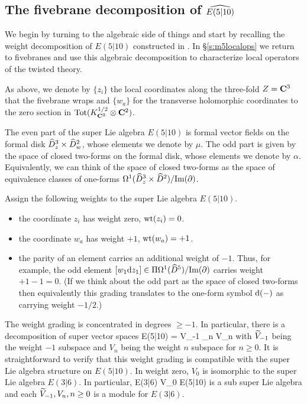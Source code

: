 \documentclass[11pt]{amsart}
\begin{document}
\subsection{The fivebrane decomposition of $\Hat{E(5|10)}$}


We begin by turning to the algebraic side of things and start by recalling the weight decomposition of $E(5|10)$ constructed in \cite{KR1}.
In \S \ref{s:m5localops} we return to fivebranes and use this algebraic decomposition to characterize local operators of the twisted theory.

\parsec[s:e510weight]

As above, we denote by $\{z_i\}$ the local coordinates along the three-fold $Z=\C^3$ that the fivebrane wraps and $\{w_a\}$ for the transverse holomorphic coordinates to the zero section in ${\rm Tot}(K_{\C^3}^{1/2} \otimes \C^2)$.

The even part of the super Lie algebra $E(5|10)$ is formal vector fields on the formal disk $\Hat{D}^3_z \times \Hat{D}^2_w$, whose elements we denote by $\mu$. 
The odd part is given by the space of closed two-forms on the formal disk, whose elements we denote by $\alpha$.
Equivalently, we can think of the space of closed two-forms as the space of equivalence classes of one-forms $\Omega^1(\Hat{D}^3_z \times \Hat{D}^2) / \text{Im}(\del)$. 

Assign the following weights to the super Lie algebra $E(5|10)$. 
\begin{itemize} 
\item the coordinate $z_i$ has weight zero, $\wt(z_i) = 0$. 
\item the coordinate $w_a$ has weight $+1$, $\wt(w_a) = +1$. 
\item the parity of an element carries an additional weight of $-1$. 
Thus, for example, the odd element $[w_1 \d z_1] \in \Pi \Omega^1(\Hat{D}^5)/{\rm Im}(\del)$ carries weight $+1 - 1 = 0$. 
(If we think about the odd part as the space of closed two-forms then equivalently this grading translates to the one-form symbol $\d(-)$ as carrying weight $-1/2$.)
\end{itemize} 
The weight grading is concentrated in degrees $\geq -1$. 
In particular, there is a decomposition of super vector spaces
\beqn\label{eqn:decomp1}
E(5|10) = \til V_{-1} \times \prod_{n } V_n 
\eeqn
with $\til V_{-1}$ being the weight $-1$ subspace and $V_n$ being the weight $n$ subspace for $n \geq 0$.  
It is straightforward to verify that this weight grading is compatible with the super Lie algebra structure on $E(5|10)$. 
In weight zero, $V_0$ is isomorphic to the super Lie algebra $E(3|6)$.
In particular, 
\beqn 
\label{eqn:e36iso}
E(3|6) \cong V_0 \subset E(5|10)
\eeqn
is a sub super Lie algebra and each $\til{V}_{-1}, V_n, n \geq 0$ is a module for $E(3|6)$. 
\end{document}
